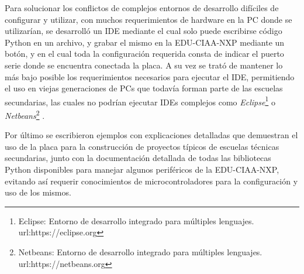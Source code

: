 Para solucionar los conflictos de complejos entornos de desarrollo difíciles de configurar y utilizar, con muchos requerimientos de hardware en la PC donde se utilizarían, se desarrolló un IDE mediante el cual solo puede escribirse código Python en un archivo, y grabar el mismo en la EDU-CIAA-NXP mediante un botón, y en el cual toda la configuración requerida consta de indicar el puerto serie donde se encuentra conectada la placa. A su vez se trató de mantener lo más bajo posible los requerimientos necesarios para ejecutar el IDE, permitiendo el uso en viejas generaciones de PCs que todavía forman parte de las escuelas secundarias, las cuales no podrían ejecutar IDEs complejos como \textit{Eclipse}\footnote{Eclipse: Entorno de desarrollo integrado para múltiples lenguajes. url:https://eclipse.org} o \textit{Netbeans}\footnote{Netbeans: Entorno de desarrollo integrado para múltiples lenguajes. url:https://netbeans.org} .

Por último se escribieron ejemplos con explicaciones detalladas que demuestran el uso de la placa para la construcción de proyectos típicos de escuelas técnicas secundarias, junto con la documentación detallada de todas las bibliotecas Python disponibles para manejar algunos periféricos de la EDU-CIAA-NXP, evitando así requerir conocimientos de microcontroladores para la configuración y uso de los mismos.







 



